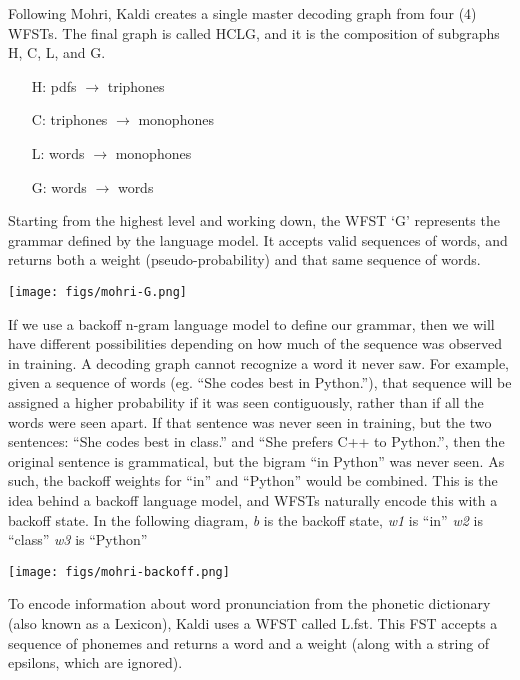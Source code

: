 \documentclass[10pt,a4paper]{article}
\begin{document}
Following Mohri, Kaldi creates a single master decoding graph from four (4) WFSTs. The final graph is called HCLG, and it is the composition of subgraphs H, C, L, and G.


\begin{enumerate}
\item[H:] pdfs $\rightarrow$ triphones
\item[C:] triphones $\rightarrow$ monophones
\item[L:] words $\rightarrow$ monophones
\item[G:] words $\rightarrow$ words
\end{enumerate}


Starting from the highest level and working down, the WFST `G' represents the grammar defined by the language model. It accepts valid sequences of words, and returns both a weight (pseudo-probability) and that same sequence of words.


\begin{center}
  \texttt{[image: figs/mohri-G.png]}
\end{center}

If we use a backoff n-gram language model to define our grammar, then we will have different possibilities depending on how much of the sequence was observed in training. A decoding graph cannot recognize a word it never saw. For example, given a sequence of words (eg. ``She codes best in Python.''), that sequence will be assigned a higher probability if it was seen contiguously, rather than if all the words were seen apart. If that sentence was never seen in training, but the two sentences: ``She codes best in class.'' and ``She prefers C++ to Python.'', then the original sentence is grammatical, but the bigram ``in Python'' was never seen. As such, the backoff weights for ``in'' and ``Python'' would be combined. This is the idea behind a backoff language model, and WFSTs naturally encode this with a backoff state. In the following diagram, \textit{b} is the backoff state, \textit{w1} is ``in'' \textit{w2} is ``class'' \textit{w3} is ``Python''

\begin{center}
  \texttt{[image: figs/mohri-backoff.png]}
\end{center}

To encode information about word pronunciation from the phonetic dictionary (also known as a Lexicon), Kaldi uses a WFST called L.fst. This FST accepts a sequence of phonemes and returns a word and a weight (along with a string of epsilons, which are ignored).
\end{document}
